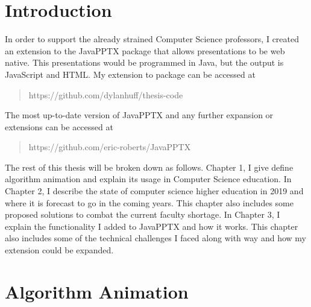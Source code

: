 \documentclass[12pt,twoside]{reedthesis}
\begin{document}
    \chapter*{Introduction}
	In order to support the already strained Computer Science professors, I created an extension to the JavaPPTX package that allows presentations to be web native. This presentations would be programmed in Java, but the output is JavaScript and HTML. My extension to package can be accessed at \begin{quote} https://github.com/dylanhuff/thesis-code \end{quote} The most up-to-date version of JavaPPTX and any further expansion or extensions can be accessed at \begin{quote} https://github.com/eric-roberts/JavaPPTX \end{quote} The rest of this thesis will be broken down as follows. Chapter 1, I give define algorithm animation and explain its usage in Computer Science education. In Chapter 2, I describe the state of computer science higher education in 2019 and where it is forecast to go in the coming years. This chapter also includes some proposed solutions to combat the current faculty shortage. In Chapter 3, I explain the functionality I added to JavaPPTX and how it works. This chapter also includes some of the technical challenges I faced along with way and how my extension could be expanded. 
	
\chapter{Algorithm Animation}
	
\end{document}
